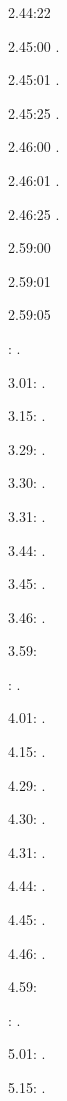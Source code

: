 \label{key}\documentclass[italian]{article}
\begin{document}
2.44:22   

2.45:00   .

2.45:01   .

2.45:25   .

2.46:00   .

2.46:01   .

2.46:25   .

2.59:00   

2.59:01   

2.59:05   

:  .

3.01:   . 

3.15:   . 

3.29:   . 

3.30:   .

3.31:   .

3.44:   .

3.45:   .

3.46:   .

3.59:   

:  .

4.01:   . 

4.15:   . 

4.29:   . 

4.30:   .

4.31:   .

4.44:   .

4.45:   .

4.46:   .

4.59:   

:  .

5.01:   . 

5.15:   . 
\end{document}
